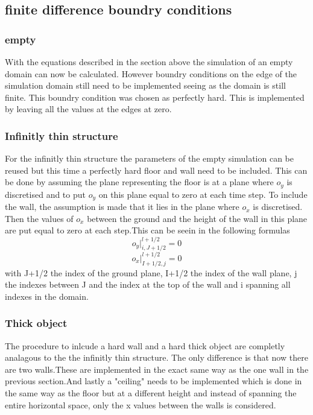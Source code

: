 \documentclass{article}
\begin{document}
\subsection{finite difference boundry conditions}

\subsubsection{empty}
With the equations described in the section above the simulation of an empty domain can now be calculated. However boundry conditions on the edge of the simulation domain still need to be implemented seeing as the domain is still finite. This boundry condition was chosen as perfectly hard. This is implemented by leaving all the values at the edges at zero.

\subsubsection{Infinitly thin structure}
For the infinitly thin structure the parameters of the empty simulation can be reused but this time a perfectly hard floor and wall need to be included. This can be done by assuming the plane representing the floor is at a plane where $o_y$ is discretised and to put $o_y$ on this plane equal to zero at each time step. To include the wall, the assumption is made that it lies in the plane where $o_x$ is discretised. Then the values of $o_x$ between the ground and the height of the wall in this plane are put equal to zero at each step.This can be seein in the following formulas
\begin{equation}
    o_y|_{i,J+1/2}^{l+1/2}=0
\end{equation}
\begin{equation}
    o_x|_{I+1/2,j}^{l+1/2}=0
\end{equation}
with J+1/2 the index of the ground plane, I+1/2 the index of the wall plane, j the indexes between J and the index at the top of the wall and i spanning all indexes in the domain.

\subsubsection{Thick object}
The procedure to inlcude a hard wall and a hard thick object are completly analagous to the the infinitly thin structure. The only difference is that now there are two walls.These are implemented in the exact same way as the one wall in the previous section.And lastly a "ceiling" needs to be implemented which is done in the same way as the floor but at a different height and instead of spanning the entire horizontal space, only the x values between the walls is considered.
\end{document}
